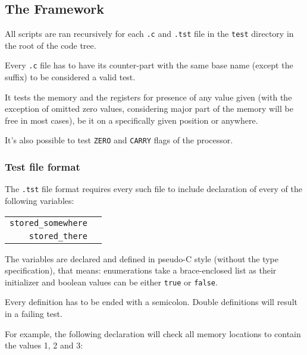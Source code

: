         \subsection{The Framework}

        All scripts are ran recursively for each \texttt{.c} and \texttt{.tst} file in the \texttt{test} directory in the root of the code tree.

        Every \texttt{.c} file has to have its counter-part with the same base name (except the suffix) to be considered a valid test.

        It tests the memory and the registers for presence of any value given (with the exception of omitted zero values, considering major part of the memory will be free in most cases), be it on a specifically given position or anywhere.

        It's also possible to test \texttt{ZERO} and \texttt{CARRY} flags of the processor.

            \subsubsection{Test file format}

            The \texttt{.tst} file format requires every such file to include declaration of every of the following variables:

            \begin{center}
            \begin{tabular}{ r | l }
                \texttt{stored\_somewhere} & \todo{...}\\

                \texttt{stored\_there} & \todo{...}\\

            \end{tabular}
            \end{center}

            The variables are declared and defined in pseudo-C style (without the type specification), that means: enumerations take a brace-enclosed list as their initializer and boolean values can be either \texttt{true} or \texttt{false}.

            Every definition has to be ended with a semicolon. Double definitions will result in a failing test.

            For example, the following declaration will check all memory locations to contain the values 1, 2 and 3:

